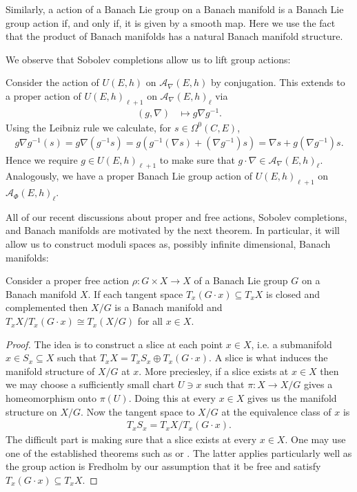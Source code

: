\documentclass[12pt]{ociamthesis}  %
\begin{document}
Similarly, a action of a Banach Lie group on a Banach manifold
is a Banach Lie group action if, and only if, it is given by a
smooth map. Here we use the fact that the product of Banach manifolds
has a natural Banach manifold structure.

We observe that Sobolev completions allow us to lift group
actions:

\begin{example}
  Consider the action of $U(E,h)$ on $\mathcal A_\nabla(E,h)$
  by conjugation. This extends to a proper action of $U(E,h)_{\ell+1}$
  on $\mathcal A_\nabla(E,h)_\ell$ via
  \begin{align*}
    (g,\nabla) & \mapsto g\nabla g^{-1}.
  \end{align*}
  Using the Leibniz rule we calculate, for $s\in\Omega^0(C,E)$,
  \begin{align*}
    g\nabla g^{-1}(s) = g\nabla(g^{-1}s) = g(g^{-1}(\nabla s) + (\nabla g^{-1})s)
    = \nabla s + g(\nabla g^{-1})s.
  \end{align*}
  Hence we require $g\in U(E,h)_{\ell + 1}$ to make sure that $g\cdot\nabla\in \mathcal A_\nabla(E,h)_\ell$.
  Analogously, we have a proper Banach Lie group action of $U(E,h)_{\ell+1}$
  on $\mathcal A_\Phi (E,h)_\ell$.
\end{example}

All of our recent discussions about proper and free actions, Sobolev
completions, and Banach manifolds are motivated by the next theorem.
In particular, it will allow us to construct moduli spaces as, possibly
infinite dimensional, Banach manifolds:

\begin{theorem}\label{thm:banach_quotient}
  Consider a proper free action $\rho : G\times X\to X$ of a Banach
  Lie group $G$ on a Banach manifold $X$. If each tangent space
  $T_x(G\cdot x) \subseteq T_x X$ is closed and complemented then
  $X/G$ is a Banach manifold and $T_x X/T_x (G\cdot x) \cong T_x(X/G)$
  for all $x\in X$.
  \begin{proof}
    The idea is to construct a slice at each point $x\in X$, i.e. a submanifold
    $x\in S_x\subseteq X$ such that $T_x X = T_xS_x \oplus T_x(G\cdot x)$. A slice is
    what induces the manifold structure of $X/G$ at $x$. More preciesley, if a slice
    exists at $x\in X$ then we may choose a sufficiently small chart $U\ni x$
    such that $\pi : X \to X/G$ gives a homeomorphism onto $\pi(U)$. Doing this
    at every $x\in X$ gives us the manifold structure on $X/G$. Now the tangent space
    to $X/G$ at the equivalence class of $x$ is
    \begin{align}\label{eq:banach_quotient_tangent}
      T_x S_x = T_x X / T_x (G\cdot x).
    \end{align}
    The difficult part is making sure that a slice exists at every $x\in X$. One may use
    one of the established theorems such as \cite[Theorem 3.28]{diez2019}
    or \cite[Theorem 5.2.6]{palais1992}. The latter applies particularly well
    as the group action is Fredholm by our assumption that it be free and satisfy
    $T_x(G\cdot x)\subseteq T_x X$.
  \end{proof}
\end{theorem}
\end{document}
